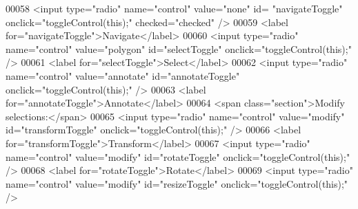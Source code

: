 \begin{DoxyCode}
00058                             <input type=\textcolor{stringliteral}{"radio"} name=\textcolor{stringliteral}{"control"} value=\textcolor{stringliteral}{"none"} \textcolor{keywordtype}{id}=\textcolor{stringliteral}{
      "navigateToggle"} onclick=\textcolor{stringliteral}{"toggleControl(this);"} checked=\textcolor{stringliteral}{"checked"} />
00059                             <label \textcolor{keywordflow}{for}=\textcolor{stringliteral}{"navigateToggle"}>Navigate</label>
00060                             <input type=\textcolor{stringliteral}{"radio"} name=\textcolor{stringliteral}{"control"} value=\textcolor{stringliteral}{"polygon"} \textcolor{keywordtype}{
      id}=\textcolor{stringliteral}{"selectToggle"} onclick=\textcolor{stringliteral}{"toggleControl(this);"} />
00061                             <label \textcolor{keywordflow}{for}=\textcolor{stringliteral}{"selectToggle"}>Select</label>
00062                             <input type=\textcolor{stringliteral}{"radio"} name=\textcolor{stringliteral}{"control"} value=\textcolor{stringliteral}{"annotate"}
       \textcolor{keywordtype}{id}=\textcolor{stringliteral}{"annotateToggle"} onclick=\textcolor{stringliteral}{"toggleControl(this);"} />
00063                             <label \textcolor{keywordflow}{for}=\textcolor{stringliteral}{"annotateToggle"}>Annotate</label>
00064                             <span \textcolor{keyword}{class}=\textcolor{stringliteral}{"section"}>Modify selections:</span>
00065                             <input type=\textcolor{stringliteral}{"radio"} name=\textcolor{stringliteral}{"control"} value=\textcolor{stringliteral}{"modify"} \textcolor{keywordtype}{
      id}=\textcolor{stringliteral}{"transformToggle"} onclick=\textcolor{stringliteral}{"toggleControl(this);"} />
00066                             <label \textcolor{keywordflow}{for}=\textcolor{stringliteral}{"transformToggle"}>Transform</label>
00067                             <input type=\textcolor{stringliteral}{"radio"} name=\textcolor{stringliteral}{"control"} value=\textcolor{stringliteral}{"modify"} \textcolor{keywordtype}{
      id}=\textcolor{stringliteral}{"rotateToggle"} onclick=\textcolor{stringliteral}{"toggleControl(this);"} />
00068                             <label \textcolor{keywordflow}{for}=\textcolor{stringliteral}{"rotateToggle"}>Rotate</label>
00069                             <input type=\textcolor{stringliteral}{"radio"} name=\textcolor{stringliteral}{"control"} value=\textcolor{stringliteral}{"modify"} \textcolor{keywordtype}{
      id}=\textcolor{stringliteral}{"resizeToggle"} onclick=\textcolor{stringliteral}{"toggleControl(this);"} />

\end{DoxyCode}

